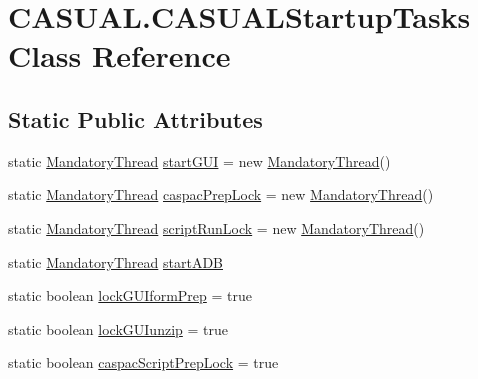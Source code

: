 \hypertarget{class_c_a_s_u_a_l_1_1_c_a_s_u_a_l_startup_tasks}{\section{C\-A\-S\-U\-A\-L.\-C\-A\-S\-U\-A\-L\-Startup\-Tasks Class Reference}
\label{class_c_a_s_u_a_l_1_1_c_a_s_u_a_l_startup_tasks}
}
\subsection*{Static Public Attributes}
\begin{DoxyCompactItemize}
\item 
static \hyperlink{class_c_a_s_u_a_l_1_1misc_1_1_mandatory_thread}{Mandatory\-Thread} \hyperlink{class_c_a_s_u_a_l_1_1_c_a_s_u_a_l_startup_tasks_ae9b5a6af6cfbc4601ce6eedf08016819}{start\-G\-U\-I} = new \hyperlink{class_c_a_s_u_a_l_1_1misc_1_1_mandatory_thread}{Mandatory\-Thread}()
\item 
static \hyperlink{class_c_a_s_u_a_l_1_1misc_1_1_mandatory_thread}{Mandatory\-Thread} \hyperlink{class_c_a_s_u_a_l_1_1_c_a_s_u_a_l_startup_tasks_a782be3fd7088ec9d40f2981113948c5e}{caspac\-Prep\-Lock} = new \hyperlink{class_c_a_s_u_a_l_1_1misc_1_1_mandatory_thread}{Mandatory\-Thread}()
\item 
static \hyperlink{class_c_a_s_u_a_l_1_1misc_1_1_mandatory_thread}{Mandatory\-Thread} \hyperlink{class_c_a_s_u_a_l_1_1_c_a_s_u_a_l_startup_tasks_ab857475aab8f73d290e1712c22b4f373}{script\-Run\-Lock} = new \hyperlink{class_c_a_s_u_a_l_1_1misc_1_1_mandatory_thread}{Mandatory\-Thread}()
\item 
static \hyperlink{class_c_a_s_u_a_l_1_1misc_1_1_mandatory_thread}{Mandatory\-Thread} \hyperlink{class_c_a_s_u_a_l_1_1_c_a_s_u_a_l_startup_tasks_a7cd653f1a174d1edf365da01aa97cdc5}{start\-A\-D\-B}
\item 
static boolean \hyperlink{class_c_a_s_u_a_l_1_1_c_a_s_u_a_l_startup_tasks_a2aa519438e5c5454a6aeac1927706b86}{lock\-G\-U\-Iform\-Prep} = true
\item 
static boolean \hyperlink{class_c_a_s_u_a_l_1_1_c_a_s_u_a_l_startup_tasks_a3116aebd500dbd313bb939a9ce4f81ab}{lock\-G\-U\-Iunzip} = true
\item 
static boolean \hyperlink{class_c_a_s_u_a_l_1_1_c_a_s_u_a_l_startup_tasks_a31fcc3f44d4aad9e291561ab7dc4549b}{caspac\-Script\-Prep\-Lock} = true
\end{DoxyCompactItemize}



